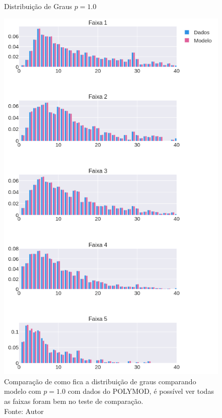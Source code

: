 \begin{figure}[H]
    \centering
    \captionsetup{font=normalsize,skip=0.8pt,singlelinecheck=on,labelsep=endash}
    \caption{Distribuição de Graus $p = 1.0$}
    \includegraphics[scale= 0.4]{figuras/comparacao.png}
    \captionsetup{font=small,justification=justified}
    \caption*{Comparação de como fica a distribuição de graus comparando modelo com $p = 1.0$ com dados do POLYMOD, é possível ver todas as faixas foram bem no teste de comparação.\\Fonte: Autor}
    \label{fig:comparacao}
\end{figure}


